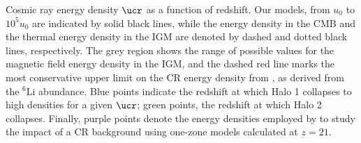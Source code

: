 \label{fig:ucr}
Cosmic ray energy density $\ucr$ as a function of redshift.  
Our models, from $u_0$ to $10^5u_0$ are indicated by solid black lines, while the energy density in the CMB and the thermal energy density in the IGM are denoted by dashed and dotted black lines, respectively. 
The grey region shows the range of possible values for the magnetic field energy density in the IGM, and the dashed red line marks the most conservative upper limit on the CR energy density from \citet{RollindeVangioniOlive2006}, as derived from the $^6$Li abundance. 
Blue points indicate the redshift at which Halo 1 collapses to high densities for a given $\ucr$; green points, the redshift at which Halo 2 collapses.  
Finally, purple points denote the energy densities employed by \citet{StacyBromm2007} to study the impact of a CR background using one-zone models calculated at $z=21$.